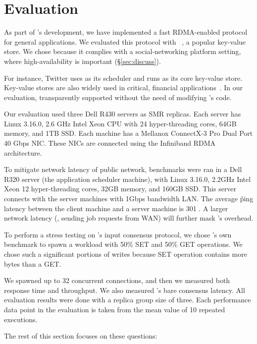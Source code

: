 \section{Evaluation} \label{sec:eval}

As part of \xxx's development, we have implemented a fast RDMA-enabled \paxos 
protocol~\cite{falcon:github} for general applications. We evaluated this 
protocol with \redis~\cite{redis}, a popular key-value store. We chose \redis 
because it complies with a social-networking platform setting, where 
high-availability is important (\S\ref{sec:discuss}).

For instance, Twitter uses \mesos as its scheduler and runs \redis as its core 
key-value store. Key-value stores are also widely used in critical, financial 
applications~\cite{nosql:finance,nosql:racs14}. In our evaluation, \xxx 
transparently supported \redis without the need of modifying \redis's code. 

Our evaluation used three Dell R430 servers as SMR replicas. Each server has 
Linux 3.16.0, 2.6 GHz Intel Xeon CPU with 24 hyper-threading cores, 64GB 
memory, and 1TB SSD. Each machine has a Mellanox ConnectX-3 Pro Dual Port 40 
Gbps NIC. These NICs are connected using the Infiniband RDMA architecture.

To mitigate network latency of public network, benchmarks were ran 
in a Dell R320 server (the application scheduler machine), with Linux 3.16.0, 
2.2GHz Intel Xeon 12 hyper-threading cores, 32GB memory, and 160GB SSD. This 
server connects with the server machines with 1Gbps bandwidth LAN. The average 
\v{ping} latency between the client machine and a server machine is 301 \us. A 
larger network latency (\eg, sending job requests from WAN) will further 
mask \xxx's overhead.

To perform a stress testing on \xxx's input consensus protocol, we chose 
\redis's own benchmark to spawn a workload with 50\% SET and 50\% GET 
operations. We chose such a significant portions of writes because SET 
operation contains more bytes than a GET.

We spawned up to 32 concurrent connections, and then we measured both response 
time and throughput. We also measured \xxx's bare consensus latency. All 
evaluation results were done with a replica group size of three. Each 
performance data point in the evaluation is taken from the mean value of 10 
repeated executions.

The rest of this section focuses on these questions:

